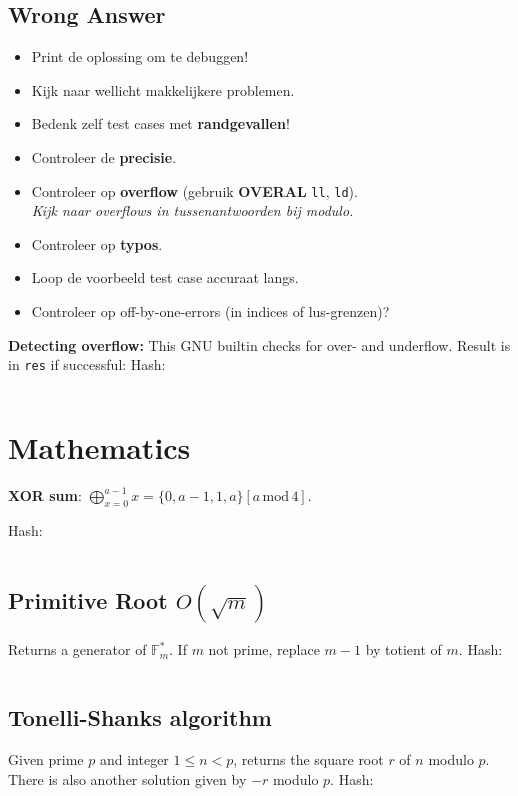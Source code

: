\documentclass[9pt,a4paper,landscape,oneside]{amsart}
\newcommand{\mintedstyle}[2]{\inputminted{#1}{code/#2}}
\newcommand{\code}[1]{ Hash: 
\mintedstyle{cpp}{#1}}
\newenvironment{myitemize}
{\begin{itemize}[leftmargin=.3cm]
	\setlength{\itemsep}{0pt}
	\setlength{\parskip}{0pt}
	\setlength{\parsep}{0pt}     }
{ \end{itemize}                  }
\begin{document}
\begin{multicols*}{3}
\subsection{Wrong Answer}

\begin{myitemize}
	\item Print de oplossing om te debuggen!
	\item Kijk naar wellicht makkelijkere problemen.
	\item Bedenk zelf test cases met \textbf{randgevallen}!
	\item Controleer de \textbf{precisie}.
	\item Controleer op \textbf{overflow} (gebruik \textbf{OVERAL} \texttt{ll}, \texttt{ld}).
		\\ \textit{Kijk naar overflows in tussenantwoorden bij modulo.}
	\item Controleer op \textbf{typo\textquotesingle s}.
	\item Loop de voorbeeld test case accuraat langs.
	\item Controleer op off-by-one-errors (in indices of lus-grenzen)?
\end{myitemize}

\textbf{Detecting overflow:}
This GNU builtin checks for over- and underflow. Result is in \texttt{res} if successful:
\code{other/overflow.cpp}

\section{Mathematics}

\textbf{XOR sum}: $\bigoplus_{x=0}^{a - 1} x = \{0, a - 1, 1, a\}[a \, \mathrm{mod} \, 4]$.

\code{math/math.cpp}

\subsection{Primitive Root $O(\sqrt{m})$}
Returns a generator of $\mathbb{F}_m^*$. If $m$ not prime, replace $m-1$ by totient of $m$.
\code{math/primitive_root.cpp}

\subsection{Tonelli-Shanks algorithm}
Given prime $p$ and integer $1\leq n<p$, returns the square root $r$ of
$n$ modulo $p$. There is also another solution given by $-r$ modulo
$p$.
\code{math/tonelli_shanks.cpp}


\end{multicols*}
\end{document}
